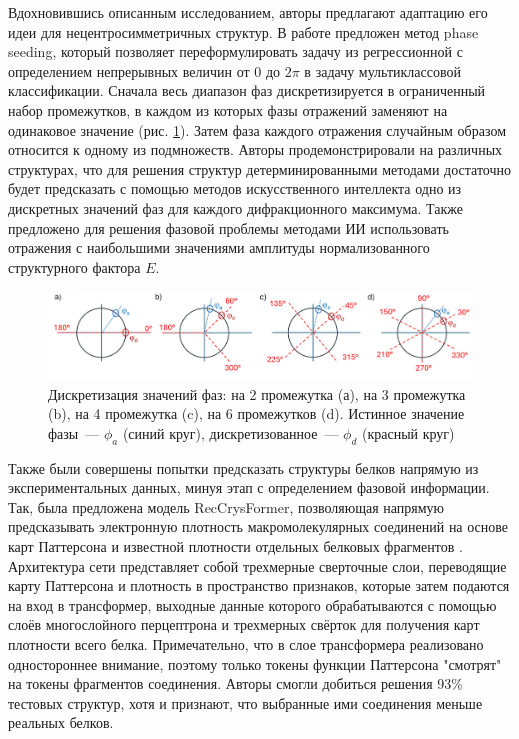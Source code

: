 Вдохновившись описанным исследованием, авторы \cite{carrozzini_phase-seeding_2025} предлагают адаптацию его идеи для нецентросимметричных структур. В работе предложен метод phase seeding, который позволяет переформулировать задачу из регрессионной с определением непрерывных величин от 0 до $2\pi$ в задачу мультиклассовой классификации. Сначала весь диапазон фаз дискретизируется в ограниченный набор промежутков, в каждом из которых фазы отражений заменяют на одинаковое значение (рис. \ref{phase_disc}). Затем фаза каждого отражения случайным образом относится к одному из подмножеств. Авторы продемонстрировали на различных структурах, что для решения структур детерминированными методами достаточно будет предсказать с помощью методов искусственного интеллекта одно из дискретных значений фаз для каждого дифракционного максимума. Также предложено для решения фазовой проблемы методами ИИ использовать отражения с наибольшими значениями амплитуды нормализованного структурного фактора $E$.

\begin{figure}[H]
	\centering
	\includegraphics[width=1\textwidth]{figures/phase_disc.png}\hfill
	\caption{Дискретизация значений фаз: на 2 промежутка (а), на 3 промежутка (b), на 4 промежутка (c), на 6 промежутков (d). Истинное значение фазы~--- $\phi_a$ (синий круг), дискретизованное~--- $\phi_d$ (красный круг) \cite{carrozzini_phase-seeding_2025}}
	\label{phase_disc}
\end{figure}

Также были совершены попытки предсказать структуры белков напрямую из экспериментальных данных, минуя этап с определением фазовой информации. Так, была предложена модель RecCrysFormer, позволяющая напрямую предсказывать электронную плотность макромолекулярных соединений на основе карт Паттерсона и известной плотности отдельных белковых фрагментов \cite{pan_reccrysformer_2025}. Архитектура сети представляет собой трехмерные сверточные слои, переводящие карту Паттерсона и плотность в пространство признаков, которые затем подаются на вход в трансформер, выходные данные которого обрабатываются с помощью слоёв многослойного перцептрона и трехмерных свёрток для получения карт плотности всего белка. Примечательно, что в слое трансформера реализовано одностороннее внимание, поэтому только токены функции Паттерсона "смотрят" на токены фрагментов соединения. Авторы смогли добиться решения 93\% тестовых структур, хотя и признают, что выбранные ими соединения меньше реальных белков.

